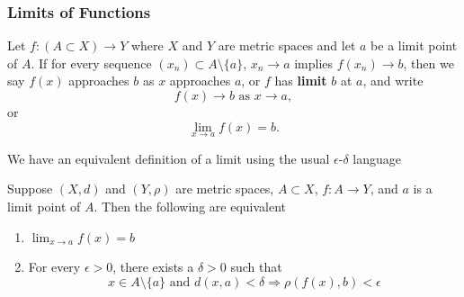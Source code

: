 \documentclass[9pt,aspectratio=169]{beamer}
\renewcommand{\implies}{\Rightarrow}
\begin{document}
\begin{frame}[allowframebreaks]
    \frametitle{Limits of Functions}
    \begin{definition}
        Let $f:(A \subset X) \to Y$ where $X$ and $Y$ are metric spaces and
        let $a$ be a limit point of $A$. If for every sequence $(x_n) \subset
        A\setminus\{a\}$, $x_n \to a$ implies $f(x_n) \to b$, then we say
        $f(x)$ approaches $b$ as $x$ approaches $a$, or $f$ has
        \textbf{limit} $b$ at $a$, and write
        \begin{equation*}
            f(x) \to b \text{ as } x \to a,
        \end{equation*}
        or
        \begin{equation*}
            \lim_{x\to a}f(x) = b.
        \end{equation*}
    \end{definition}
    \framebreak
    We have an equivalent definition of a limit using the usual
    $\epsilon$-$\delta$ language
    \begin{theorem}
        Suppose $(X, d)$ and $(Y, \rho)$ are metric spaces, $A \subset X$,
        $f: A \to Y$, and $a$ is a limit point of $A$. Then the following are
        equivalent
        \begin{enumerate}
            \item $\lim_{x \to a} f(x) = b$
            \item For every $\epsilon > 0$, there exists a $\delta > 0$ such
            that
            \begin{equation*}
                x \in A \setminus \{a\} \text{ and } d(x, a) < \delta
                \implies \rho(f(x), b) < \epsilon
            \end{equation*}
        \end{enumerate}
    \end{theorem}
\end{frame}
\end{document}
